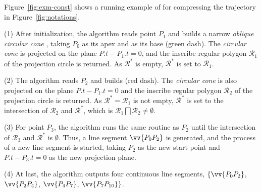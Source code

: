\begin{example}
	\label{exm-alg-conest}
	Figure~\ref{fig:exm-const} shows a running example of \cised for compressing the trajectory  in Figure~\ref{fig:notations}.%
	
	\sstab (1) After initialization, the \cised algorithm reads point $P_1$ and builds a narrow \emph{oblique circular cone} , taking $P_0$ as its apex and  as its base (green dash). The \emph{circular cone} is projected on the plane $P.t-P_1.t=0$, and the inscribe regular polygon $\mathcal{R}_1$ of the projection circle is returned. As $\mathcal{R}^*$ is empty, $\mathcal{R}^*$ is set to $\mathcal{R}_1$.
	
	\sstab(2) The algorithm reads $P_2$ and builds  (red dash). The \emph{circular cone} is also projected on the plane $P.t-P_1.t=0$ and the inscribe regular polygon $\mathcal{R}_2$ of the projection circle is returned. As $\mathcal{R}^*=\mathcal{R}_1$ is not empty, $\mathcal{R}^*$ is set to the intersection of $\mathcal{R}_2$ and $\mathcal{R}^*$, which is $\mathcal{R}_1 \bigsqcap \mathcal{R}_2 \ne \emptyset$.
	
	\sstab (3) For point $P_3$, the algorithm runs the same routine as $P_2$ until the intersection of $\mathcal{R}_3$ and $\mathcal{R}^*$ is $\emptyset$. Thus, a line segment $\vv{P_0P_2}$ is generated, and the process of a new line segment is started, taking $P_2$ as the new start point and $P.t-P_3.t=0$ as the new projection plane.
	
	\sstab (4) At last, the algorithm outputs four continuous line segments, \ie $\{\vv{P_0P_2}$, $\vv{P_2P_4}$, $\vv{P_4P_{7}}$, $\vv{P_7P_{10}}\}$. %
\end{example}


